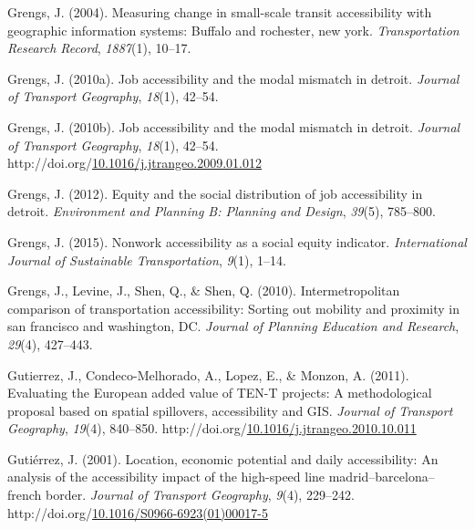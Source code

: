 \documentclass[
11pt, %
oneside, %
english, %
singlespacing, %
]{macthesis} %
\newlength{\cslhangindent}
\newenvironment{CSLReferences}[2] %
{\begin{list}{}{%
	\setlength{\itemindent}{0pt}
	\setlength{\leftmargin}{0pt}
	\setlength{\parsep}{0pt}
	\ifodd #1
	\setlength{\leftmargin}{\cslhangindent}
	\setlength{\itemindent}{-1\cslhangindent}
	\fi
	\setlength{\itemsep}{#2\baselineskip}}}
{\end{list}}
\begin{document}
\begin{CSLReferences}{1}{0}
Grengs, J. (2004). Measuring change in small-scale transit accessibility with geographic information systems: Buffalo and rochester, new york. \emph{Transportation Research Record}, \emph{1887}(1), 10--17.

Grengs, J. (2010a). Job accessibility and the modal mismatch in detroit. \emph{Journal of Transport Geography}, \emph{18}(1), 42--54.

Grengs, J. (2010b). Job accessibility and the modal mismatch in detroit. \emph{Journal of Transport Geography}, \emph{18}(1), 42--54. http://doi.org/\href{https://doi.org/10.1016/j.jtrangeo.2009.01.012}{10.1016/j.jtrangeo.2009.01.012}

Grengs, J. (2012). Equity and the social distribution of job accessibility in detroit. \emph{Environment and Planning B: Planning and Design}, \emph{39}(5), 785--800.

Grengs, J. (2015). Nonwork accessibility as a social equity indicator. \emph{International Journal of Sustainable Transportation}, \emph{9}(1), 1--14.

Grengs, J., Levine, J., Shen, Q., \& Shen, Q. (2010). Intermetropolitan comparison of transportation accessibility: Sorting out mobility and proximity in san francisco and washington, DC. \emph{Journal of Planning Education and Research}, \emph{29}(4), 427--443.

Gutierrez, J., Condeco-Melhorado, A., Lopez, E., \& Monzon, A. (2011). Evaluating the {European} added value of {TEN}-{T} projects: A methodological proposal based on spatial spillovers, accessibility and {GIS}. \emph{Journal of Transport Geography}, \emph{19}(4), 840--850. http://doi.org/\href{https://doi.org/10.1016/j.jtrangeo.2010.10.011}{10.1016/j.jtrangeo.2010.10.011}

Gutiérrez, J. (2001). Location, economic potential and daily accessibility: An analysis of the accessibility impact of the high-speed line madrid--barcelona--french border. \emph{Journal of Transport Geography}, \emph{9}(4), 229--242. http://doi.org/\href{https://doi.org/10.1016/S0966-6923(01)00017-5}{10.1016/S0966-6923(01)00017-5}


\end{CSLReferences}
\end{document}
